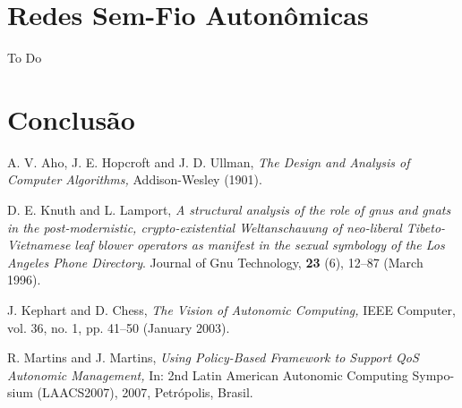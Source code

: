 \documentclass[11pt,twoside]{article}
\begin{document}
\section{Redes Sem-Fio Autonômicas}
To Do
\section{Conclusão}
\begin{thebibliography}{99}

 A. V. Aho, J. E. Hopcroft and J.  D.  Ullman, {\it The
Design and Analysis of Computer Algorithms,} Addison-Wesley (1901).

 D. E. Knuth and L. Lamport, {\it A structural analysis
of the role of gnus and gnats in the post-modernistic, crypto-existential 
Weltanschauung of neo-liberal Tibeto-Vietnamese leaf blower operators 
as manifest in the sexual symbology of the Los Angeles Phone Directory}.
Journal of Gnu Technology, {\bf 23} (6), 12--87
(March 1996).

 J. Kephart and D. Chess, {\it The Vision of Autonomic 
Computing,} IEEE Computer, vol. 36, no. 1, pp. 41--50
(January 2003).

 R. Martins and J. Martins, {\it Using Policy-Based Framework to Support QoS 
Autonomic Management,} In: 2nd Latin American Autonomic Computing Sympo- sium (LAACS2007), 
2007, Petrópolis, Brasil.
\end{thebibliography}
\end{document}
